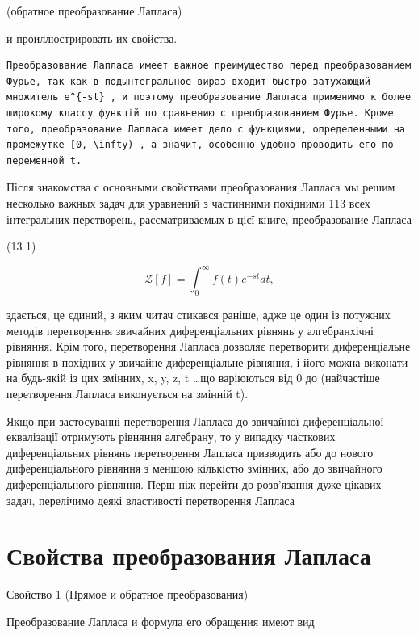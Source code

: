 \documentclass[
  ukrainian,
]{article}
\begin{document}
(обратное преобразование Лапласа)

и проиллюстрировать их свойства.

\begin{verbatim}
Преобразование Лапласа имеет важное преимущество перед преобразованием Фурье, так как в подынтегральное вираз входит быстро затухающий множитель e^{-st} , и поэтому преобразование Лапласа применимо к более широкому классу функцій по сравнению с преобразованием Фурье. Кроме того, преобразование Лапласа имеет дело с функциями, определенными на промежутке [0, \infty) , а значит, особенно удобно проводить его по переменной t.
\end{verbatim}

Після знакомства с основными свойствами преобразования Лапласа мы решим
несколько важных задач для уравнений з частинними похідними 113 всех
інтегральних перетворень, рассматриваемых в цієї книге, преобразование
Лапласа

(13 1)

\[
\mathscr{Z}[f] = \int_{0}^{\infty} f(t) e^{-st} dt,
\]

здається, це єдиний, з яким читач стикався раніше, адже це один із
потужних методів перетворення звичайних диференціальних рівнянь у
алгебранхічні рівняння. Крім того, перетворення Лапласа дозволяє
перетворити диференціальне рівняння в похідних у звичайне диференціальне
рівняння, і його можна виконати на будь-якій із цих змінних, x, y, z, t
\ldots що варіюються від 0 до \infty (найчастіше перетворення Лапласа
виконується на змінній t).

Якщо при застосуванні перетворення Лапласа до звичайної диференціальної
еквалізації отримують рівняння алгебрану, то у випадку часткових
диференціальних рівнянь перетворення Лапласа призводить або до нового
диференціального рівняння з меншою кількістю змінних, або до звичайного
диференціального рівняння. Перш ніж перейти до розв'язання дуже цікавих
задач, перелічимо деякі властивості перетворення Лапласа

\section{Свойства преобразования
Лапласа}\label{ux441ux432ux43eux439ux441ux442ux432ux430-ux43fux440ux435ux43eux431ux440ux430ux437ux43eux432ux430ux43dux438ux44f-ux43bux430ux43fux43bux430ux441ux430}

Свойство 1 (Прямое и обратное преобразования)

Преобразование Лапласа и формула его обращения имеют вид
\end{document}
